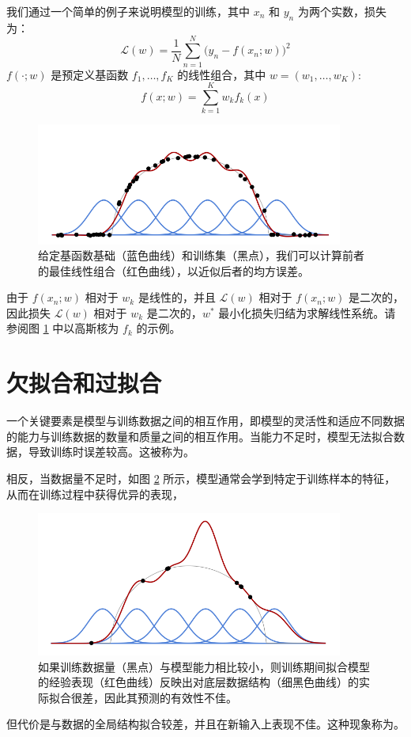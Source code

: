 我们通过一个简单的例子来说明模型的训练，其中 $x_n$ 和 $y_n$ 为两个实数，损失为：
\begin{equation}
    \mathcal{L}(w) = \frac{1}{N}\sum_{n=1}^{N}\big(y_n-f(x_n;w)\big)^2\label{eq1.1}
\end{equation}
$f(\cdot;w)$ 是预定义基函数 $f_1, \dots , f_K$ 的线性组合，其中 $w =(w_1, \dots ,w_K)$:
\[f(x;w) = \sum_{k=1}^{K}w_kf_k(x)\]
\begin{figure}
    \centering
    \includegraphics[width=0.9\textwidth]{fig/fig1.1.png}
    \caption[核回归]{给定基函数基础（蓝色曲线）和训练集（黑点），我们可以计算前者的最佳线性组合（红色曲线），以近似后者的均方误差。}
    \label{fig1.1}
\end{figure}
由于 $f(x_n;w)$ 相对于 $w_k$ 是线性的，并且 $\mathcal{L}(w)$ 相对于 $f(x_n;w)$ 是二次的，因此损失 $\mathcal{L}(w)$ 相对于 $w_k$ 是二次的，$w^*$ 最小化损失归结为求解线性系统。请参阅图 \ref{fig1.1} 中以高斯核为 $f_k$ 的示例。

\section{欠拟合和过拟合}

一个关键要素是模型与训练数据之间的相互作用，即模型的灵活性和适应不同数据的能力与训练数据的数量和质量之间的相互作用。当能力不足时，模型无法拟合数据，导致训练时误差较高。这被称为。

相反，当数据量不足时，如图 \ref{fig1.2} 所示，模型通常会学到特定于训练样本的特征，从而在训练过程中获得优异的表现，
\begin{figure}
    \centering
    \includegraphics[width=0.9\textwidth]{fig/fig1.2.png}
    \caption[核回归的过拟合]{如果训练数据量（黑点）与模型能力相比较小，则训练期间拟合模型的经验表现（红色曲线）反映出对底层数据结构（细黑色曲线）的实际拟合很差，因此其预测的有效性不佳。}
    \label{fig1.2}
\end{figure}
但代价是与数据的全局结构拟合较差，并且在新输入上表现不佳。这种现象称为。

